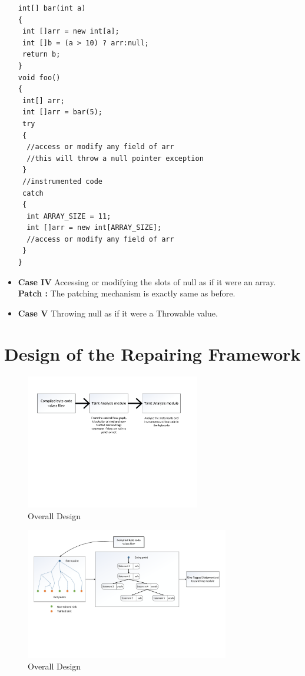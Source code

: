 \documentclass{sigplanconf}
\begin{document}
\begin{itemize}
  \lstset{language=Java, caption=array null pointer exception,
  label=patchingexample2}

\begin{lstlisting}
int[] bar(int a)
{
 int []arr = new int[a];
 int []b = (a > 10) ? arr:null;
 return b; 
}
void foo()
{
 int[] arr;
 int []arr = bar(5);
 try
 {
  //access or modify any field of arr
  //this will throw a null pointer exception
 }
 //instrumented code
 catch
 {
  int ARRAY_SIZE = 11;
  int []arr = new int[ARRAY_SIZE];
  //access or modify any field of arr
 }
}
\end{lstlisting}
  \item \textbf{Case IV} Accessing or modifying the slots of null as if it were
  an array.
 \textbf{Patch :} The patching mechanism is exactly same as before.
 
  \item \textbf{Case V} Throwing null as if it were a Throwable value.
\end{itemize}


\section{Design of the Repairing Framework}
\label{sec:Design}


\begin{figure}[!htb]
\centering
\includegraphics[width=3.0in]{images/OverallDesign.pdf}
\caption{Overall Design}
\label{fig:overallDesign}
\end{figure}


\begin{figure}[!htb]
\centering
\includegraphics[width=3.5in]{images/TaintModule.pdf}
\caption{Overall Design}
\label{fig:TaintModule}
\end{figure}
\end{document}
